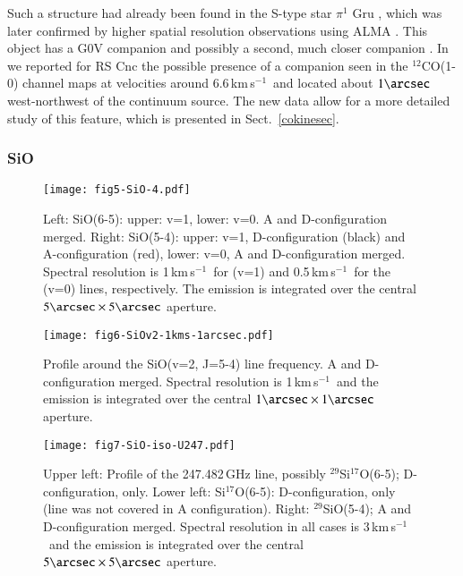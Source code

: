 \documentclass{aa}
\newcommand{\kms}{\,km\,s$^{-1}$~}
\begin{document}
Such a structure had already been found in the S-type star $\pi^1$ Gru
\citep{sah92}, which was later confirmed by higher spatial resolution
observations using ALMA \citep{2017A&A...605A..28D}. This object has
a G0V companion \citep{fea53} and possibly a second, much closer
companion \citep{2020A&A...644A..61H}. In \citet{hmwng14} we reported
for RS Cnc the possible presence of a companion seen in the
$^{12}$CO(1-0) channel maps at velocities around 6.6\kms and located
about $1\arcsec$ west-northwest of the continuum source.  The new data
allow for a more detailed study of this feature, which is presented in
Sect.~\ref{cokinesec}.

\subsubsection{SiO}\label{siosec}

\begin{figure}[h]
    \centering
    \texttt{[image: fig5-SiO-4.pdf]}
    \caption{Left: SiO(6-5): upper: v=1, lower: v=0. A and D-configuration 
             merged. 
             Right: SiO(5-4): upper: v=1, D-configuration 
             (black) and A-configuration (red), lower: v=0,  A and 
             D-configuration merged.
             Spectral resolution is 1\kms for (v=1) and 0.5\kms for the (v=0) 
             lines, respectively. The emission
             is integrated  over the central $5\arcsec \times 5\arcsec$
             aperture.}
    \label{siodetecfig}
\end{figure}

\begin{figure}[h]
    \centering
    \vspace{-3.0cm}
    \texttt{[image: fig6-SiOv2-1kms-1arcsec.pdf]}
    \caption{Profile around the SiO(v=2, J=5-4) line frequency. A and 
             D-configuration merged.
             Spectral resolution is 1\kms and the emission is integrated 
             over the central $1\arcsec \times 1\arcsec$ aperture.}
    \label{siov2linefig}
\end{figure}

\begin{figure}[h]
    \centering
    \texttt{[image: fig7-SiO-iso-U247.pdf]}
    \caption{Upper left: Profile of the 247.482\,GHz line, possibly
             $^{29}$Si$^{17}$O(6-5); D-configuration, only.  
             Lower left: Si$^{17}$O(6-5): D-configuration, only (line was 
                    not covered in A configuration).  
             Right: $^{29}$SiO(5-4); A and D-configuration merged.  
             Spectral resolution in all cases is 3\kms and the emission is
             integrated over the central $5\arcsec \times 5\arcsec$ aperture.}
    \label{sioisodetecfig}
\end{figure}
\end{document}

